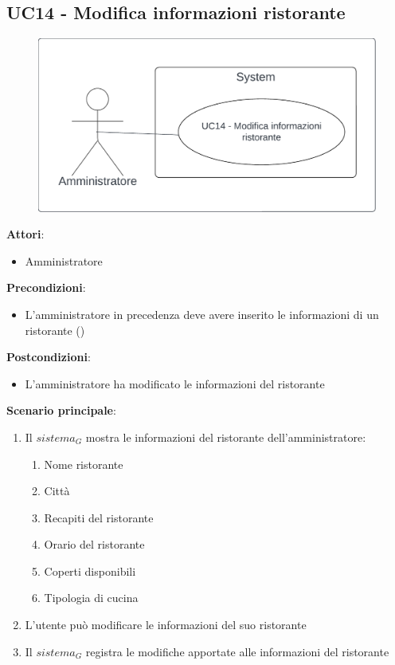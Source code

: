 \subsection{UC14 - Modifica informazioni ristorante} \label{usecase:14}
\begin{figure}[H]
    \centering
    \includegraphics[width=0.9\linewidth]{ucd/ucd14.png}
\end{figure}
\textbf{Attori}:
\begin{itemize}
    \item Amministratore
\end{itemize}
\textbf{Precondizioni}:
\begin{itemize}
    \item L'amministratore in precedenza deve avere inserito le informazioni di un ristorante ()
\end{itemize}
\textbf{Postcondizioni}:
\begin{itemize}
    \item L'amministratore ha modificato le informazioni del ristorante
\end{itemize}
\textbf{Scenario principale}:
\begin{enumerate}
    \item Il $\textit{sistema}_G$ mostra le informazioni del ristorante dell'amministratore:
    \begin{enumerate}
        \item Nome ristorante
        \item Città
        \item Recapiti del ristorante
        \item Orario del ristorante
        \item Coperti disponibili
        \item Tipologia di cucina
    \end{enumerate}
    \item L'utente può modificare le informazioni del suo ristorante
    \item Il $\textit{sistema}_G$ registra le modifiche apportate alle informazioni del ristorante
\end{enumerate}
\newpage